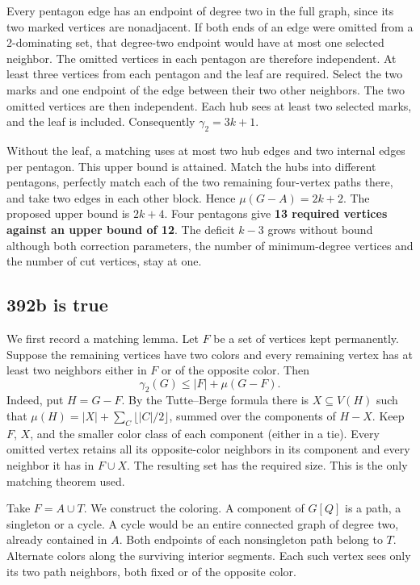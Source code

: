 \documentclass[11pt]{article}
\begin{document}
Every pentagon edge has an endpoint of degree two in the full graph, since its two marked vertices are nonadjacent. If both ends of an edge were omitted from a 2-dominating set, that degree-two endpoint would have at most one selected neighbor. The omitted vertices in each pentagon are therefore independent. At least three vertices from each pentagon and the leaf are required. Select the two marks and one endpoint of the edge between their two other neighbors. The two omitted vertices are then independent. Each hub sees at least two selected marks, and the leaf is included. Consequently \(\gamma_2=3k+1\).

Without the leaf, a matching uses at most two hub edges and two internal edges per pentagon. This upper bound is attained. Match the hubs into different pentagons, perfectly match each of the two remaining four-vertex paths there, and take two edges in each other block. Hence \(\mu(G-A)=2k+2\). The proposed upper bound is \(2k+4\). Four pentagons give \textbf{13 required vertices against an upper bound of 12}. The deficit \(k-3\) grows without bound although both correction parameters, the number of minimum-degree vertices and the number of cut vertices, stay at one.

\subsection{392b is true}\label{b-is-true}

We first record a matching lemma. Let \(F\) be a set of vertices kept permanently. Suppose the remaining vertices have two colors and every remaining vertex has at least two neighbors either in \(F\) or of the opposite color. Then
\[\gamma_2(G)\le |F|+\mu(G-F).\]
Indeed, put \(H=G-F\). By the Tutte--Berge formula there is \(X\subseteq V(H)\) such that \(\mu(H)=|X|+\sum_C\lfloor |C|/2\rfloor\), summed over the components of \(H-X\). Keep \(F\), \(X\), and the smaller color class of each component (either in a tie). Every omitted vertex retains all its opposite-color neighbors in its component and every neighbor it has in \(F\cup X\). The resulting set has the required size. This is the only matching theorem used.

Take \(F=A\cup T\). We construct the coloring. A component of \(G[Q]\) is a path, a singleton or a cycle. A cycle would be an entire connected graph of degree two, already contained in \(A\). Both endpoints of each nonsingleton path belong to \(T\). Alternate colors along the surviving interior segments. Each such vertex sees only its two path neighbors, both fixed or of the opposite color.
\end{document}
